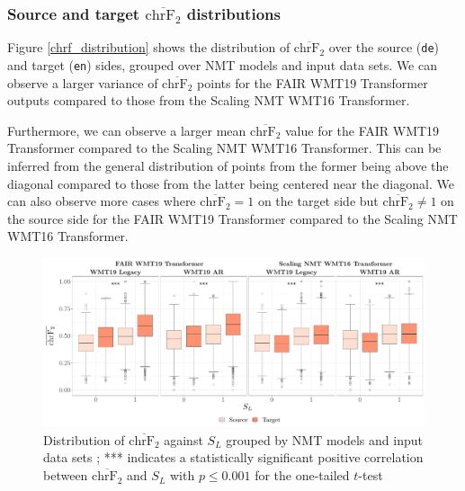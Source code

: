 \documentclass[11pt,a4paper]{article}
\begin{document}
\subsubsection{Source and target $\overline{\text{chrF}_2}$ distributions}

Figure \ref{chrf_distribution} shows the distribution of $\overline{\text{chrF}_2}$ over the source (\texttt{de}) and target (\texttt{en}) sides, grouped over NMT models and input data sets. We can observe a larger variance of $\overline{\text{chrF}_2}$ points for the FAIR WMT19 Transformer outputs compared to those from the Scaling NMT WMT16 Transformer.

Furthermore, we can observe a larger mean $\overline{\text{chrF}_2}$ value for the FAIR WMT19 Transformer compared to the Scaling NMT WMT16 Transformer. This can be inferred from the general distribution of points from the former being above the diagonal compared to those from the latter being centered near the diagonal. We can also observe more cases where $\overline{\text{chrF}_2} = 1$ on the target side but $\overline{\text{chrF}_2} \neq 1$ on the source side for the FAIR WMT19 Transformer compared to the Scaling NMT WMT16 Transformer. 

\begin{figure}
  \centering 
  \includegraphics[trim={0.25cm 0cm 0cm 0cm},clip,width=\textwidth]{chrf_paraphrase_detection_boxplot_joint_decision.pdf}
  \caption{Distribution of $\overline{\text{chrF}_2}$ against $S_L$ grouped by NMT models and input data sets ; *** indicates a statistically significant positive correlation between $\overline{\text{chrF}_2}$ and $S_L$ with $p \leq 0.001$ for the one-tailed $t$-test}
  \label{chrf_paraphrase_detection_joint_boxplot}
\end{figure}
\end{document}
